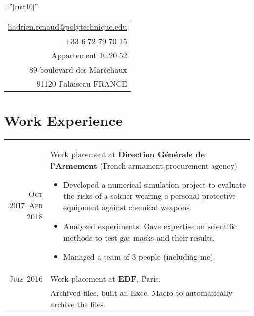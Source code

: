 \documentclass[a4paper,10pt]{article} %
\begin{document}
\pagestyle{empty} %

\font\fb=''[cmr10]'' %



\par{\hfill{}\hfill
\begin{tabular}{|r}
\href{mailto:hadrien.renaud@polytechnique.edu}{hadrien.renaud@polytechnique.edu}\\
+33 6 72 79 70 15\\
Appartement 10.20.52\\
89 boulevard des Maréchaux \\
91120 Palaiseau
FRANCE
\end{tabular}
\bigskip\par} %



\section{Work Experience}

\begin{tabular}{r|p{11cm}}
\textsc{Oct 2017--Apr 2018} & Work placement at \textbf{Direction Générale de l'Armement} (French armament procurement agency)
\small{\begin{itemize}[noitemsep, nolistsep, leftmargin=0.5cm]
  \item Developed a numerical simulation project to evaluate the risks of a soldier wearing a personal protective equipment against chemical weapons.
  \item Analyzed experiments. Gave expertise on scientific methods to test gas masks and their results.
  \item Managed a team of 3 people (including me).
\end{itemize}}\\


\textsc{July 2016} & Work placement at \textbf{EDF}, Paris. \\
& \small{Archived files, built an Excel Macro to automatically archive the files.}
\end{tabular}
\end{document}
